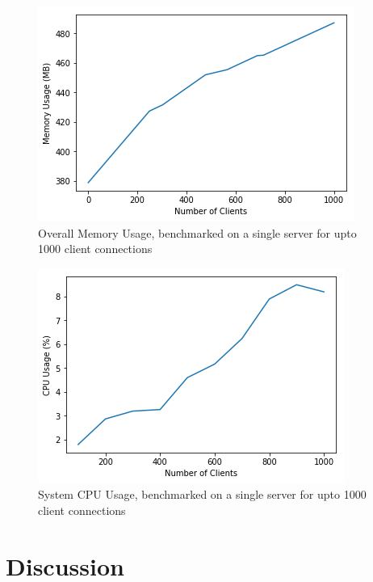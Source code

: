 \documentclass[a4paper]{IEEEtran}
\begin{document}
  \begin{figure}[tbp]
    \centering
      \includegraphics[width=\columnwidth]{benchmark_memory_usage}
    \caption{Overall Memory Usage, benchmarked on a single server for upto 1000 client connections}
    \label{fig:memory_usage}
  \end{figure}

  \begin{figure}[tbp]
    \centering
      \includegraphics[width=\columnwidth]{benchmark_cpu_usage}
    \caption{System CPU Usage, benchmarked on a single server for upto 1000 client connections}
    \label{fig:cpu_usage}
  \end{figure} 

  \section{Discussion}
  
\end{document}
